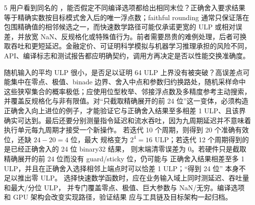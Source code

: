 \begin{solutionexercise}{5}
用户看到同名的 ，能否假定不同编译选项都给出相同末位？正确舍入要求结果等于精确实数按目标模式舍入后的唯一浮点数；faithful rounding 通常只保证落在包围精确值的相邻候选之一，而快速数学路径可能仅承诺更宽的 ULP 或相对误差，并放宽 NaN、反规格化或特殊值行为。前者需要昂贵的难例处理，后者可换取吞吐和更短延迟。金融定价、可证明科学模拟与机器学习推理承担的风险不同，API、编译标志和测试报告都应明确契约，调用方再决定是否以性能交换准确度。

随机输入的平均 ULP 很小，是否足以证明 64 ULP 上界没有被突破？高误差点可能集中在零点、极值、binade 边界、舍入中点和参数归约换路处，随机采样命中这些狭窄集合的概率极低；应使用位型枚举、邻接浮点数及多精度参考主动搜索，并覆盖反规格化与非有限值。对“只截取精确展开的前 24 位”这一变体，必须构造正确舍入向上进位的例子，才能验证它与正确舍入结果至多相差 1 ULP、且该界确实可达到。最后还要分别测量指令延迟和流水吞吐，因为九周期延迟并不意味着执行单元每九周期才接受一个新操作。
\variantheading 若迭代 10 个周期，则得到 20 个准确有效位，还缺 $24-20=4$ 位，最大
规格变为 $2^4=16$ ULP；若迭代 12 个周期得到的是已经正确舍入的 24 位 binary32 结果，
则末端清零误差为 0。若硬件只是截取精确展开的前 24 位而没有 guard/sticky 位，仍可能与
正确舍入结果相差至多 1 ULP，并且在正确舍入选择相邻上端点时可以恰差 1 ULP；“得到 24 位”
本身不足以推出零 ULP。
\practiceheading 选择快速数学函数时，应在业务输入域上同时测延迟、吞吐量和最大/分位 ULP，
并专门覆盖零点、极值、巨大参数与 NaN/无穷。编译选项和 GPU 架构会改变实现路径，验证结果
应与工具链及目标架构一起归档。
\end{solutionexercise}
